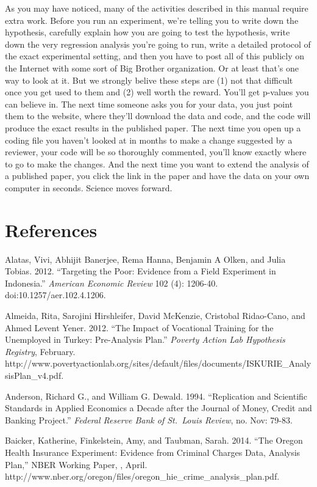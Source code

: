 \documentclass[12pt] {article}
\begin{document}
As you may have noticed, many of the activities described in this manual
require extra work. Before you run an experiment, we're telling you to
write down the hypothesis, carefully explain how you are going to test
the hypothesis, write down the very regression analysis you're going to
run, write a detailed protocol of the exact experimental setting, and
then you have to post all of this publicly on the Internet with some
sort of Big Brother organization. Or at least that's one way to look at
it. But we strongly belive these steps are (1) not that difficult once
you get used to them and (2) well worth the reward. You'll get p-values
you can believe in. The next time someone asks you for your data, you
just point them to the website, where they'll download the data and
code, and the code will produce the exact results in the published
paper. The next time you open up a coding file you haven't looked at in
months to make a change suggested by a reviewer, your code will be so
thoroughly commented, you'll know exactly where to go to make the
changes. And the next time you want to extend the analysis of a
published paper, you click the link in the paper and have the data on
your own computer in seconds. Science moves forward.

\section{References}\label{references}

Alatas, Vivi, Abhijit Banerjee, Rema Hanna, Benjamin A Olken, and Julia
Tobias. 2012. ``Targeting the Poor: Evidence from a Field Experiment in
Indonesia.'' \emph{American Economic Review} 102 (4): 1206-40.
doi:10.1257/aer.102.4.1206.

Almeida, Rita, Sarojini Hirshleifer, David McKenzie, Cristobal
Ridao-Cano, and Ahmed Levent Yener. 2012. ``The Impact of Vocational
Training for the Unemployed in Turkey: Pre-Analysis Plan.''
\emph{Poverty Action Lab Hypothesis Registry}, February.
http://www.povertyactionlab.org/sites/default/files/documents/ISKURIE\_AnalysisPlan\_v4.pdf.

Anderson, Richard G., and William G. Dewald. 1994. ``Replication and
Scientific Standards in Applied Economics a Decade after the Journal of
Money, Credit and Banking Project.'' \emph{Federal Reserve Bank of
St.~Louis Review}, no. Nov: 79-83.

Baicker, Katherine, Finkelstein, Amy, and Taubman, Sarah. 2014. ``The
Oregon Health Insurance Experiment: Evidence from Criminal Charges Data,
Analysis Plan,'' NBER Working Paper, , April.
http://www.nber.org/oregon/files/oregon\_hie\_crime\_analysis\_plan.pdf.
\end{document}
